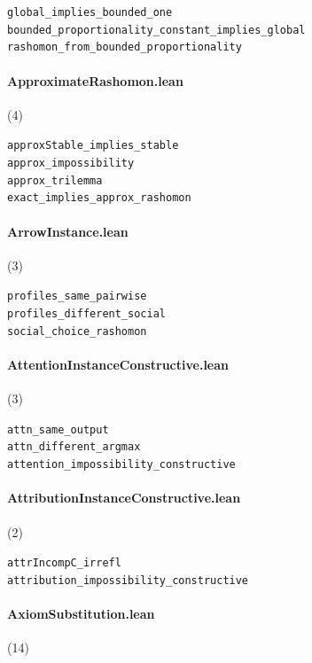 {\footnotesize
\texttt{global\_implies\_bounded\_one}\\
\texttt{bounded\_proportionality\_constant\_implies\_global}\\
\texttt{rashomon\_from\_bounded\_proportionality}\\
}

\paragraph{ApproximateRashomon.lean} (4)

{\footnotesize
\texttt{approxStable\_implies\_stable}\\
\texttt{approx\_impossibility}\\
\texttt{approx\_trilemma}\\
\texttt{exact\_implies\_approx\_rashomon}\\
}

\paragraph{ArrowInstance.lean} (3)

{\footnotesize
\texttt{profiles\_same\_pairwise}\\
\texttt{profiles\_different\_social}\\
\texttt{social\_choice\_rashomon}\\
}

\paragraph{AttentionInstanceConstructive.lean} (3)

{\footnotesize
\texttt{attn\_same\_output}\\
\texttt{attn\_different\_argmax}\\
\texttt{attention\_impossibility\_constructive}\\
}

\paragraph{AttributionInstanceConstructive.lean} (2)

{\footnotesize
\texttt{attrIncompC\_irrefl}\\
\texttt{attribution\_impossibility\_constructive}\\
}

\paragraph{AxiomSubstitution.lean} (14)

